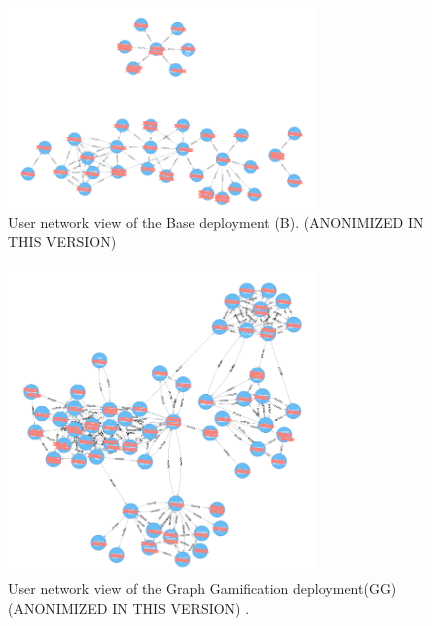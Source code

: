 
\begin{figure}[!t]
    \centering
        \includegraphics[width=3.2in]{img/user_known_2.png}
    \caption{User network view of the Base deployment (B). (ANONIMIZED IN THIS VERSION) }
    \label{fig:B-network}
\end{figure}
\begin{figure}[!t]
    \centering
        \includegraphics[width=3.2in]{img/user_known_3.png}
    \caption{User network view of the Graph Gamification deployment(GG) (ANONIMIZED IN THIS VERSION) .}
    \label{fig:GG-network}
  \end{figure}
  
